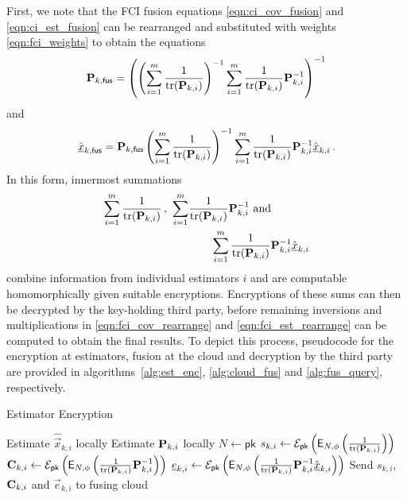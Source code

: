 \documentclass[letterpaper, 10 pt, conference]{ieeeconf}
\begin{document}
First, we note that the FCI fusion equations \eqref{eqn:ci_cov_fusion} and \eqref{eqn:ci_est_fusion} can be rearranged and substituted with weights \eqref{eqn:fci_weights} to obtain the equations
\begin{equation}\label{eqn:fci_cov_rearrange}
    {\ensuremath{{\mathbf{P}}}}_{k,\mathsf{fus}} = \left(\left(\sum_{i=1}^m \frac{1}{\operatorname{tr}({{\mathbf{P}}}_{k,i})}\right)^{-1}\sum_{i=1}^m \frac{1}{\operatorname{tr}({{\mathbf{P}}}_{k,i})}{{\mathbf{P}}}_{k,i}^{-1}\right)^{-1}
\end{equation}
and
\begin{equation}\label{eqn:fci_est_rearrange}
    \hat{{\underline{x}}}_{k,\mathsf{fus}} = {{\mathbf{P}}}_{k,\mathsf{fus}}\left(\sum_{i=1}^m \frac{1}{\operatorname{tr}({{\mathbf{P}}}_{k,i})}\right)^{-1}\sum_{i=1}^m\frac{1}{\operatorname{tr}({{\mathbf{P}}}_{k,i})}{{\mathbf{P}}}_{k,i}^{-1}\hat{{\underline{x}}}_{k,i}\,.
\end{equation}
In this form, innermost summations  
\begin{equation}
    \begin{split}
        \sum_{i=1}^m \frac{1}{\operatorname{tr}({{\mathbf{P}}}_{k,i})}\,,\ \sum_{i=1}^m &\frac{1}{\operatorname{tr}({{\mathbf{P}}}_{k,i})}{{\mathbf{P}}}_{k,i}^{-1}\text{ and }\\ 
        &\qquad\sum_{i=1}^m\frac{1}{\operatorname{tr}({{\mathbf{P}}}_{k,i})}{{\mathbf{P}}}_{k,i}^{-1}\hat{{\underline{x}}}_{k,i}
    \end{split}
\end{equation}
combine information from individual estimators $i$ and are computable homomorphically given suitable encryptions. Encryptions of these sums can then be decrypted by the key-holding third party, before remaining inversions and multiplications in \eqref{eqn:fci_cov_rearrange} and \eqref{eqn:fci_est_rearrange} can be computed to obtain the final results. To depict this process, pseudocode for the encryption at estimators, fusion at the cloud and decryption by the third party are provided in algorithms~\ref{alg:est_enc}, \ref{alg:cloud_fus} and \ref{alg:fus_query}, respectively.
\begin{algorithm}[htbp]
\caption{Estimator Encryption}\label{alg:est_enc}
\begin{algorithmic}[1]
    \State Estimate $\hat{\vec{x}}_{k,i}$ locally
    \State Estimate ${{\mathbf{P}}}_{k,i}$ locally
    \State $N \gets \mathsf{pk}$
    \State $s_{k,i} \gets \mathcal{E}_{\mathsf{pk}}\left(\mathsf{E}_{N,\phi}\left(\frac{1}{\operatorname{tr}({{\mathbf{P}}}_{k,i})}\right)\right)$
    \State ${{\mathbf{C}}}_{k,i} \gets \mathcal{E}_{\mathsf{pk}}\left(\mathsf{E}_{N,\phi}\left(\frac{1}{\operatorname{tr}({{\mathbf{P}}}_{k,i})}{{\mathbf{P}}}_{k,i}^{-1}\right)\right)$
    \State ${\underline{e}}_{k,i} \gets \mathcal{E}_{\mathsf{pk}}\left(\mathsf{E}_{N,\phi}\left(\frac{1}{\operatorname{tr}({{\mathbf{P}}}_{k,i})}{{\mathbf{P}}}_{k,i}^{-1}\hat{{\underline{x}}}_{k,i}\right)\right)$
    \State Send $s_{k,i}$, ${{\mathbf{C}}}_{k,i}$ and $\vec{e}_{k,i}$ to fusing cloud
    \EndProcedure
\end{algorithmic}
\end{algorithm}
\end{document}
